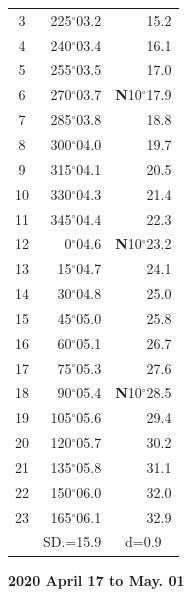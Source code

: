 \documentclass[10pt, a4paper]{report}
\begin{document}
\begin{scriptsize}
\begin{tabular*}{0.2\textwidth}[t]{@{\extracolsep{\fill}}|c|rr|}
3 & 225$^\circ$03.2 & \raisebox{0.24ex}{\boldmath$\cdot$~\boldmath$\cdot$~~}15.2\\
4 & 240$^\circ$03.4 & 16.1\\
5 & 255$^\circ$03.5 & 17.0\\[2Pt]
6 & 270$^\circ$03.7 & \textbf{N}10$^\circ$17.9\\
7 & 285$^\circ$03.8 & 18.8\\
8 & 300$^\circ$04.0 & 19.7\\
9 & 315$^\circ$04.1 & \raisebox{0.24ex}{\boldmath$\cdot$~\boldmath$\cdot$~~}20.5\\
10 & 330$^\circ$04.3 & 21.4\\
11 & 345$^\circ$04.4 & 22.3\\[2Pt]
12 & 0$^\circ$04.6 & \textbf{N}10$^\circ$23.2\\
13 & 15$^\circ$04.7 & 24.1\\
14 & 30$^\circ$04.8 & 25.0\\
15 & 45$^\circ$05.0 & \raisebox{0.24ex}{\boldmath$\cdot$~\boldmath$\cdot$~~}25.8\\
16 & 60$^\circ$05.1 & 26.7\\
17 & 75$^\circ$05.3 & 27.6\\[2Pt]
18 & 90$^\circ$05.4 & \textbf{N}10$^\circ$28.5\\
19 & 105$^\circ$05.6 & 29.4\\
20 & 120$^\circ$05.7 & 30.2\\
21 & 135$^\circ$05.8 & \raisebox{0.24ex}{\boldmath$\cdot$~\boldmath$\cdot$~~}31.1\\
22 & 150$^\circ$06.0 & 32.0\\
23 & 165$^\circ$06.1 & 32.9\\
\hline
\rule{0pt}{2.4ex} & \multicolumn{1}{c}{SD.=15.9} & \multicolumn{1}{c|}{d=0.9}\\
\hline
\end{tabular*}

\end{scriptsize}
\newpage
\sffamily
\noindent
\begin{flushright}
\textbf{2020 April 17 to May. 01}\par
\end{flushright}
\end{document}
